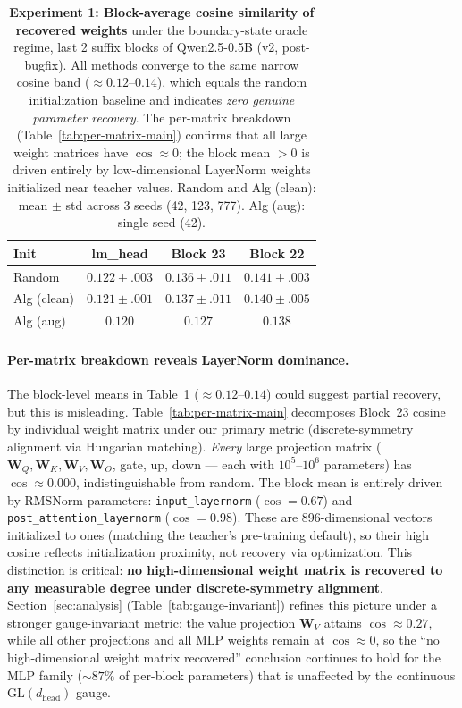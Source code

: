 \documentclass{article}
\newcommand{\bW}{\mathbf{W}}
\begin{document}
\begin{table}[t]
\centering
\caption{\textbf{Experiment 1: Block-average cosine similarity of recovered weights} under the boundary-state oracle regime, last 2 suffix blocks of Qwen2.5-0.5B (v2, post-bugfix).  All methods converge to the same narrow cosine band ($\approx 0.12$--$0.14$), which equals the random initialization baseline and indicates \emph{zero genuine parameter recovery}.  The per-matrix breakdown (Table~\ref{tab:per-matrix-main}) confirms that all large weight matrices have $\cos \approx 0$; the block mean $> 0$ is driven entirely by low-dimensional LayerNorm weights initialized near teacher values.  Random and Alg (clean): mean $\pm$ std across 3 seeds (42, 123, 777). Alg (aug): single seed (42).}
\label{tab:exp1}
\small
\begin{tabular}{@{}l ccc@{}}
\toprule
\textbf{Init} & \textbf{lm\_head} & \textbf{Block 23} & \textbf{Block 22} \\
\midrule
Random         & $0.122 \pm .003$ & $0.136 \pm .011$ & $0.141 \pm .003$ \\
Alg (clean)    & $0.121 \pm .001$ & $0.137 \pm .011$ & $0.140 \pm .005$ \\
Alg (aug)      & $0.120$ & $0.127$ & $0.138$ \\
\bottomrule
\end{tabular}
\end{table}

\paragraph{Per-matrix breakdown reveals LayerNorm dominance.}
The block-level means in Table~\ref{tab:exp1} ($\approx 0.12$--$0.14$) could suggest partial recovery, but this is misleading.  Table~\ref{tab:per-matrix-main} decomposes Block~23 cosine by individual weight matrix under our primary metric (discrete-symmetry alignment via Hungarian matching).  \emph{Every} large projection matrix ($\bW_Q, \bW_K, \bW_V, \bW_O$, gate, up, down --- each with $10^5$--$10^6$ parameters) has $\cos \approx 0.000$, indistinguishable from random.  The block mean is entirely driven by RMSNorm parameters: \texttt{input\_layernorm} ($\cos = 0.67$) and \texttt{post\_attention\_layernorm} ($\cos = 0.98$).  These are 896-dimensional vectors initialized to ones (matching the teacher's pre-training default), so their high cosine reflects initialization proximity, not recovery via optimization.  This distinction is critical: \textbf{no high-dimensional weight matrix is recovered to any measurable degree under discrete-symmetry alignment}.  Section~\ref{sec:analysis} (Table~\ref{tab:gauge-invariant}) refines this picture under a stronger gauge-invariant metric: the value projection $\bW_V$ attains $\cos \approx 0.27$, while all other projections and all MLP weights remain at $\cos \approx 0$, so the ``no high-dimensional weight matrix recovered'' conclusion continues to hold for the MLP family ($\sim 87\%$ of per-block parameters) that is unaffected by the continuous $\mathrm{GL}(d_\text{head})$ gauge.
\end{document}
